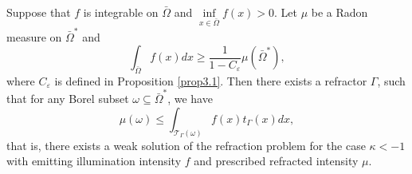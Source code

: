 \documentclass[a4paper,12pt,]{article}
\newtheorem{theorem}{\hskip\parindent\bf Theorem}[section]%
\numberwithin{equation}{section}
\numberwithin{equation}{section} \allowdisplaybreaks
\begin{document}
\begin{theorem}
  Suppose that $f$ is integrable on $\bar{\Omega}$ and $\inf\limits_{x\in \bar{\Omega}}f(x)>0$. Let $\mu$ be a Radon measure on $\bar{\Omega}^{\ast}$ and
  \begin{equation}\label{3.16}
    \int_{\bar{\Omega}}f(x)dx \geq \frac{1}{1 - C_{\varepsilon}}\mu(\bar{\Omega}^{\ast}),
  \end{equation}
  where $C_{\varepsilon}$ is defined in Proposition \ref{prop3.1}. Then there exists a refractor $\Gamma$, such that for any Borel subset $\omega \subseteq \bar{\Omega}^{\ast}$, we have
  $$\mu(\omega) \leq \int_{\mathcal{T}_{\Gamma}(\omega)}f(x)t_{\Gamma}(x)dx,$$
  that is, there exists a weak solution of the refraction problem for the case $\kappa < -1$ with emitting illumination intensity $f$ and prescribed refracted intensity $\mu$.
  \label{thm3.4}
\end{theorem}
\end{document}

